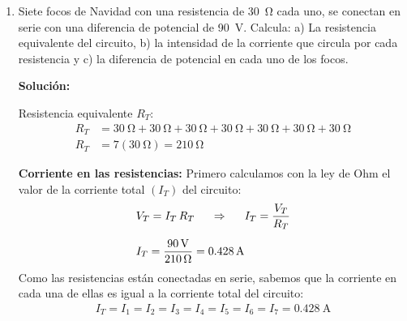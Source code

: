 \documentclass[14pt]{extarticle}
\begin{document}
\begin{enumerate}
\item Siete focos de Navidad con una resistencia de \SI{30}{\ohm} cada uno, se conectan en serie con una diferencia de potencial de \SI{90}{\volt}. Calcula: a) La resistencia equivalente del circuito, b) la intensidad de la corriente que circula por cada resistencia y c) la diferencia de potencial en cada uno de los focos.

\textbf{Solución:}

Resistencia equivalente $R_{T}$:
\begin{align*}
R_{T} &= \SI{30}{\ohm} + \SI{30}{\ohm} + \SI{30}{\ohm} + \SI{30}{\ohm} + \SI{30}{\ohm} + \SI{30}{\ohm} + \SI{30}{\ohm} \\[0.5em]
R_{T} &= 7 (\SI{30}{\ohm}) = \SI{210}{\ohm} 
\end{align*}

\textbf{Corriente en las resistencias:} Primero calculamos con la ley de Ohm el valor de la corriente total $(I_{T})$ del circuito:
\begin{align*}
&V_{T} = I_{T} \, R_{T} \hspace{0.5cm} \Rightarrow \hspace{0.5cm} I_{T} = \dfrac{V_{T}}{R_{T}} \\[0.5em]
&I_{T} = \dfrac{\SI{90}{\volt}}{\SI{210}{\ohm}} = \SI{0.428}{\ampere}
\end{align*}
Como las resistencias están conectadas en serie, sabemos que la corriente en cada una de ellas es igual a la corriente total del circuito:
\begin{align*}
I_{T} = I_{1} = I_{2} = I_{3} = I_{4} = I_{5} = I_{6} = I_{7} = \SI{0.428}{\ampere}
\end{align*}


\end{enumerate}
\end{document}
